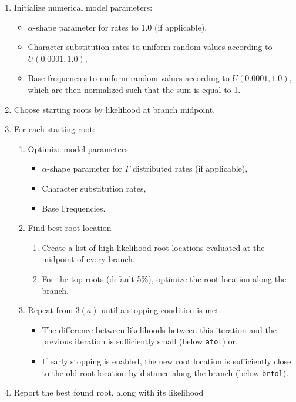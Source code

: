 \documentclass{article}
\begin{document}
\begin{enumerate}
  \item Initialize numerical model parameters:
        \begin{itemize}
          \item $\alpha$-shape parameter for rates to $1.0$ (if applicable),
          \item Character substitution rates to uniform random values according
                to $U(0.0001, 1.0)$,
          \item Base frequencies to uniform random values according to
                $U(0.0001, 1.0)$, which are then normalized such that the sum is
                equal to 1.
        \end{itemize}
  \item Choose starting roots by likelihood at branch midpoint.
  \item For each starting root:
        \begin{enumerate}
          \item Optimize model parameters
                \begin{itemize}
                  \item $\alpha$-shape parameter for $\Gamma$ distributed rates
                    (if applicable),
                  \item Character substitution rates,
                  \item Base Frequencies.
                \end{itemize}
          \item Find best root location
                \begin{enumerate}
                  \item Create a list of high likelihood root locations
                        evaluated at the midpoint of every branch.
                  \item For the top roots (default 5\%), optimize the root
                        location along the branch.
                \end{enumerate}
          \item Repeat from $3(a)$ until a stopping condition is met:
                \begin{itemize}
                  \item The difference between likelihoods between this
                        iteration and the previous iteration is sufficiently
                        small (below \texttt{atol}) or,
                  \item If early stopping is enabled, the new root location is
                        sufficiently close to the old root location by distance
                        along the branch (below \texttt{brtol}).
                \end{itemize}
        \end{enumerate}
  \item Report the best found root, along with its likelihood
\end{enumerate}
\end{document}
